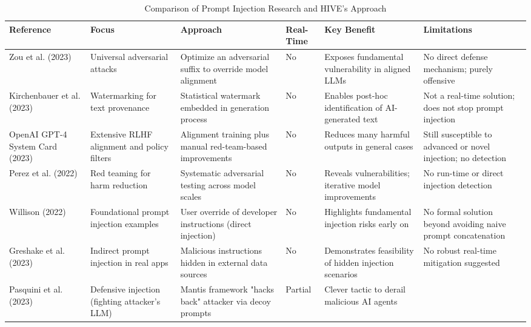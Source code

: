 \documentclass[manuscript,screen,review]{acmart}
\begin{document}
\begin{table}[!htbp]
\caption{Comparison of Prompt Injection Research and HIVE's Approach}
\label{table:comparison}
\setlength{\tabcolsep}{6pt}
\renewcommand{\arraystretch}{1.2}
\setcellgapes{4pt}
\makegapedcells
\centering
\scriptsize

\begin{tabular}{p{55pt}p{60pt}p{70pt}p{40pt}p{70pt}p{75pt}}
\toprule
\textbf{\small Reference} & \textbf{\small Focus} & \textbf{\small Approach} & \textbf{\small Real-Time} & \textbf{\small Key Benefit} & \textbf{\small Limitations} \\
\midrule
Zou et al. (2023) ~\cite{b1} & 
Universal adversarial attacks &
Optimize an adversarial suffix to override model alignment &
No &
Exposes fundamental vulnerability in aligned LLMs &
No direct defense mechanism; purely offensive \\
\midrule
Kirchenbauer et al. (2023) ~\cite{b2} &
Watermarking for text provenance &
Statistical watermark embedded in generation process &
No &
Enables post-hoc identification of AI-generated text &
Not a real-time solution; does not stop prompt injection \\
\midrule
OpenAI GPT-4 System Card (2023) ~\cite{b3} &
Extensive RLHF alignment and policy filters &
Alignment training plus manual red-team-based improvements &
No &
Reduces many harmful outputs in general cases &
Still susceptible to advanced or novel injection; no detection \\
\midrule
Perez et al. (2022) ~\cite{b4} &
Red teaming for harm reduction &
Systematic adversarial testing across model scales &
No &
Reveals vulnerabilities; iterative model improvements &
No run-time or direct injection detection \\
\midrule
Willison (2022) ~\cite{b5} &
Foundational prompt injection examples &
User override of developer instructions (direct injection) &
No &
Highlights fundamental injection risks early on &
No formal solution beyond avoiding naive prompt concatenation \\
\midrule
Greshake et al. (2023) ~\cite{b6} &
Indirect prompt injection in real apps &
Malicious instructions hidden in external data sources &
No &
Demonstrates feasibility of hidden injection scenarios &
No robust real-time mitigation suggested \\
\midrule
Pasquini et al. (2023) ~\cite{b7} &
Defensive injection (fighting attacker's LLM) &
Mantis framework "hacks back" attacker via decoy prompts &
Partial &
Clever tactic to derail malicious AI agents &

\end{tabular}
\end{table}
\end{document}
